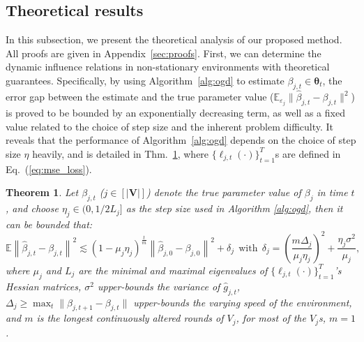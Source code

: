 \documentclass{article}
\theoremstyle{plain}
\newtheorem{theorem}{Theorem}[section]
\theoremstyle{definition}
\theoremstyle{remark}
\def \Eq {Eq.}
\def \thm {Thm.}
\def \V {\mathbf{V}}
\def \V {\mathbf{V}}
\begin{document}
\subsection{Theoretical results}
\label{sec:theo}
In this subsection, we present the theoretical analysis of our proposed method. 
All proofs are given in Appendix~\ref{sec:proofs}. 
First, we can determine the dynamic influence relations in non-stationary environments with theoretical guarantees. 
Specifically, by using Algorithm~\ref{alg:ogd} to estimate $\beta_{j, t}\in\bm{\theta}_t$, 
the error gap between the estimate and the true parameter value ($\mathbb{E}_{\varepsilon_j}\|\hat{\beta}_{j, t} - \beta_{j, t}\|^2$) is proved to be bounded by an exponentially decreasing term, 
as well as a fixed value related to the choice of step size and the inherent problem difficulty. 
It reveals that the performance of Algorithm~\ref{alg:ogd} depends on the choice of step size $\eta$ heavily, 
and is detailed in \thm~\ref{theo:identi}, where $\{\ell_{j, t}(\cdot)\}_{t=1}^T$s are defined in \Eq~(\ref{eq:mse_loss}). 

\begin{theorem}
  \label{theo:identi}
  Let $\beta_{j, t}$ ($j\in[|\V|]$) denote the true parameter value of $\beta_j$ in time $t$, and choose $\eta_j\in(0, 1/2L_j]$ as the step size used in Algorithm \ref{alg:ogd}, 
  then it can be bounded that: 
  \vskip -0.1in
  \begin{equation*}
      \mathbb{E}\left\|\hat{\beta}_{j, t} - \beta_{j, t}\right\|^2 \lesssim (1-\mu_j \eta_j)^{\frac{t}{m}} \left\|\hat{\beta}_{j, 0} - \beta_{j, 0}\right\|^2 + \delta_j\ \ 
      \text{with}\ \ \delta_j = \left(\frac{m\Delta_j }{\mu_j \eta_j}\right)^2 + \frac{\eta_j\sigma^2}{\mu_j}, 
  \end{equation*}
  where $\mu_j$ and $L_j$ are the minimal and maximal eigenvalues of $\{\ell_{j, t}(\cdot)\}_{t=1}^T$'s Hessian matrices,
  $\sigma^2$ upper-bounds the variance of $\hat{g}_{j, t}$, 
  $\Delta_j \geq \max_t \|\beta_{j,t+1} - \beta_{j, t}\|$ upper-bounds the varying speed of the environment, 
  and $m$ is the longest continuously altered rounds of $V_j$, for most of the $V_j$s, $m = 1$.
\end{theorem}
\end{document}
